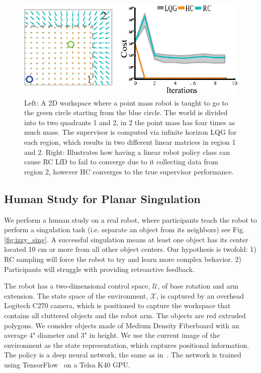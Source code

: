 \documentclass[10pt, conference]{ieeeconf}      %
\begin{document}
\begin{figure}
\centering
\includegraphics{f_figs/p_mass.eps}
\caption{
    \footnotesize
Left: A 2D workspace where a point mass robot is taught to go to the green circle starting from the blue circle. The world is divided into to two quadrants 1 and 2, in 2 the point mass has four times as much mass. The supervisor is computed via infinite horizon LQG for each region, which results in two different linear matrices in region 1 and 2. Right: Illustrates how having a linear robot policy class can cause RC LfD to fail  to converge due to it collecting data from region 2, however HC converges to the true supervisor performance. }
\vspace*{-1pt}
\label{fig:p_mass}
\end{figure}

\subsection{Human Study for Planar Singulation}
We perform a human study on a real robot, where participants teach the robot to perform a singulation task (i.e. separate an object from its neighbors) see Fig. \ref{fig:izzy_sing}. A successful singulation means at least one object has its center located 10 cm or more from all other object centers. Our hypothesis is twofold: 1) RC sampling will force the robot to try and learn more complex behavior. 2) Participants will struggle with providing retroactive feedback. 

The robot has a two-dimensional control space, $\mathcal{U}$, of base rotation and arm extension. The state space of the environment, $\mathcal{X}$, is captured by an overhead Logitech C270 camera, which is positioned to capture the workspace that contains all cluttered objects and the robot arm.  The objects are red extruded polygons. We consider objects made of Medium Density Fiberboard with an average 4" diameter and 3" in height.  We use the current image of the environment as the state representation, which captures positional information. The policy is a deep neural network, the same as in~\cite{laskeyrobot}. The network is trained using TensorFlow~\cite{tensorflow2015-whitepaper} on a Telsa K40 GPU. 
\end{document}
